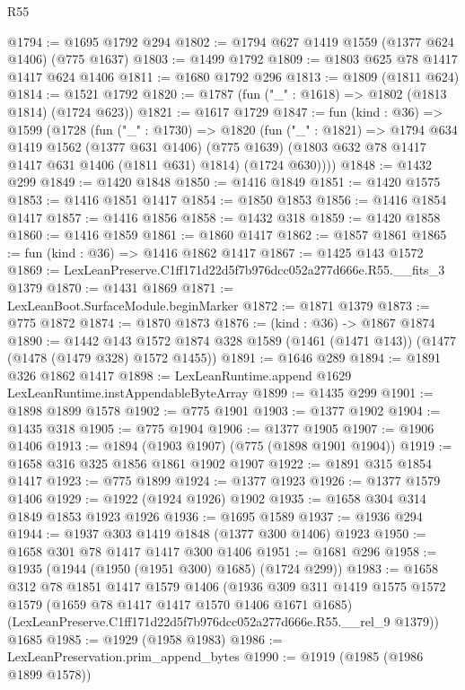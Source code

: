 \begin{lexlean}{R55}
\begin{coremodule}
{{@1794 := @1695 @1792 @294
@1802 := @1794 @627 @1419 @1559 (@1377 @624 @1406) (@775 @1637)
@1803 := @1499 @1792
@1809 := @1803 @625 @78 @1417 @1417 @624 @1406
@1811 := @1680 @1792 @296
@1813 := @1809 (@1811 @624)
@1814 := @1521 @1792
@1820 := @1787 (fun ("_" : @1618) => @1802 (@1813 @1814) (@1724 @623))
@1821 := @1617 @1729
@1847 := fun (kind : @36) =>
  @1599
    (@1728
      (fun ("_" : @1730) =>
      @1820
        (fun ("_" : @1821) =>
        @1794
          @634
          @1419
          @1562
          (@1377 @631 @1406)
          (@775 @1639)
          (@1803 @632 @78 @1417 @1417 @631 @1406 (@1811 @631) @1814)
          (@1724 @630))))
@1848 := @1432 @299
@1849 := @1420 @1848
@1850 := @1416 @1849
@1851 := @1420 @1575
@1853 := @1416 @1851 @1417
@1854 := @1850 @1853
@1856 := @1416 @1854 @1417
@1857 := @1416 @1856
@1858 := @1432 @318
@1859 := @1420 @1858
@1860 := @1416 @1859
@1861 := @1860 @1417
@1862 := @1857 @1861
@1865 := fun (kind : @36) => @1416 @1862 @1417
@1867 := @1425 @143 @1572
@1869 := LexLeanPreserve.C1ff171d22d5f7b976dcc052a277d666e.R55.__fits_3 @1379
@1870 := @1431 @1869
@1871 := LexLeanBoot.SurfaceModule.beginMarker
@1872 := @1871 @1379
@1873 := @775 @1872
@1874 := @1870 @1873
@1876 := (kind : @36) -> @1867 @1874
@1890 := @1442
    @143
    @1572
    @1874
    @328
    @1589
    (@1461 (@1471 @143))
    (@1477 (@1478 (@1479 @328) @1572 @1455))
@1891 := @1646 @289
@1894 := @1891 @326 @1862 @1417
@1898 := LexLeanRuntime.append @1629 LexLeanRuntime.instAppendableByteArray
@1899 := @1435 @299
@1901 := @1898 @1899 @1578
@1902 := @775 @1901
@1903 := @1377 @1902
@1904 := @1435 @318
@1905 := @775 @1904
@1906 := @1377 @1905
@1907 := @1906 @1406
@1913 := @1894 (@1903 @1907) (@775 (@1898 @1901 @1904))
@1919 := @1658 @316 @325 @1856 @1861 @1902 @1907
@1922 := @1891 @315 @1854 @1417
@1923 := @775 @1899
@1924 := @1377 @1923
@1926 := @1377 @1579 @1406
@1929 := @1922 (@1924 @1926) @1902
@1935 := @1658 @304 @314 @1849 @1853 @1923 @1926
@1936 := @1695 @1589
@1937 := @1936 @294
@1944 := @1937 @303 @1419 @1848 (@1377 @300 @1406) @1923
@1950 := @1658 @301 @78 @1417 @1417 @300 @1406
@1951 := @1681 @296
@1958 := @1935 (@1944 (@1950 (@1951 @300) @1685) (@1724 @299))
@1983 := @1658
    @312
    @78
    @1851
    @1417
    @1579
    @1406
    (@1936
      @309
      @311
      @1419
      @1575
      @1572
      @1579
      (@1659 @78 @1417 @1417 @1570 @1406 @1671 @1685)
      (LexLeanPreserve.C1ff171d22d5f7b976dcc052a277d666e.R55.__rel_9 @1379))
    @1685
@1985 := @1929 (@1958 @1983)
@1986 := LexLeanPreservation.prim_append_bytes
@1990 := @1919 (@1985 (@1986 @1899 @1578))
}}
\end{coremodule}
\end{lexlean}
